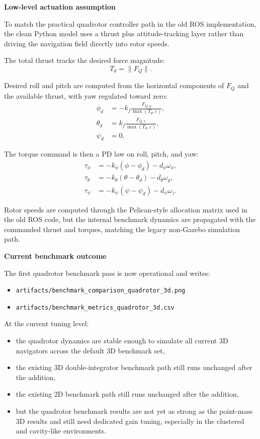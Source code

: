 \documentclass[11pt]{article}
\begin{document}
\textbf{Low-level actuation assumption}

To match the practical quadrotor controller path in the old ROS implementation,
the clean Python model uses a thrust plus attitude-tracking layer rather than
driving the navigation field directly into rotor speeds.

The total thrust tracks the desired force magnitude:
\[
T_d = \lVert F_Q \rVert .
\]

Desired roll and pitch are computed from the horizontal components of \(F_Q\)
and the available thrust, with yaw regulated toward zero:
\begin{align}
\phi_d &= -k_f \frac{F_{Q,y}}{\max(T_d,\varepsilon)}, \\
\theta_d &= k_f \frac{F_{Q,x}}{\max(T_d,\varepsilon)}, \\
\psi_d &= 0 .
\end{align}

The torque command is then a PD law on roll, pitch, and yaw:
\begin{align}
\tau_\phi &= -k_\phi (\phi - \phi_d) - d_\phi \omega_x, \\
\tau_\theta &= -k_\theta (\theta - \theta_d) - d_\theta \omega_y, \\
\tau_\psi &= -k_\psi (\psi - \psi_d) - d_\psi \omega_z .
\end{align}

Rotor speeds are computed through the Pelican-style allocation matrix used in
the old ROS code, but the internal benchmark dynamics are propagated with the
commanded thrust and torques, matching the legacy non-Gazebo simulation path.

\textbf{Current benchmark outcome}

The first quadrotor benchmark pass is now operational and writes:
\begin{itemize}[leftmargin=*]
  \item \texttt{artifacts/benchmark\_comparison\_quadrotor\_3d.png}
  \item \texttt{artifacts/benchmark\_metrics\_quadrotor\_3d.csv}
\end{itemize}

At the current tuning level:
\begin{itemize}[leftmargin=*]
  \item the quadrotor dynamics are stable enough to simulate all current 3D navigators across the default 3D benchmark set,
  \item the existing 3D double-integrator benchmark path still runs unchanged after the addition,
  \item the existing 2D benchmark path still runs unchanged after the addition,
  \item but the quadrotor benchmark results are not yet as strong as the point-mass 3D results and still need dedicated gain tuning, especially in the clustered and cavity-like environments.
\end{itemize}
\end{document}
